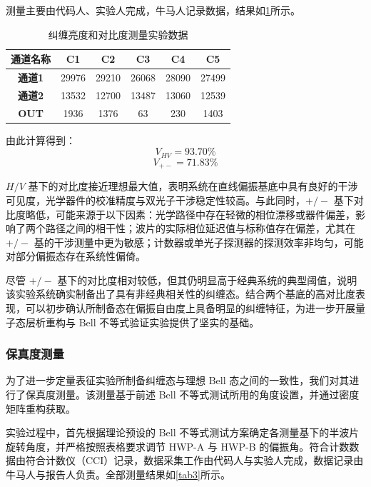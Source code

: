 测量主要由代码人、实验人完成，牛马人记录数据，结果如\cref{tab2}所示。

\begin{table}[h!]
	\centering
	\begin{tabular}{|c|c|c|c|c|c|}
		\hline
		\textbf{通道名称} & \textbf{C1} & \textbf{C2} & \textbf{C3} & \textbf{C4} & \textbf{C5} \\ \hline
		\textbf{通道1} & 29976 & 29210 & 26068 & 28090 & 27499 \\ \hline
		\textbf{通道2} & 13532 & 12700 & 13487 & 13060 & 12539 \\ \hline
		\textbf{OUT} & 1936 & 1376 & 63 & 230 & 1403 \\ \hline
	\end{tabular}
	\caption{纠缠亮度和对比度测量实验数据}
	\label{tab2}
\end{table}

由此计算得到：
$$ V_{HV} = 93.70\% $$
$$ V_{+-} = 71.83 \% $$

$H/V$ 基下的对比度接近理想最大值，表明系统在直线偏振基底中具有良好的干涉可见度，光学器件的校准精度与双光子干涉稳定性较高。与此同时，$+/-$ 基下对比度略低，可能来源于以下因素：光学路径中存在轻微的相位漂移或器件偏差，影响了两个路径之间的相干性；波片的实际相位延迟值与标称值存在偏差，尤其在 $+/-$ 基的干涉测量中更为敏感；计数器或单光子探测器的探测效率非均匀，可能对部分偏振态存在系统性偏倚。

尽管 $+/-$ 基下的对比度相对较低，但其仍明显高于经典系统的典型阈值，说明该实验系统确实制备出了具有非经典相关性的纠缠态。结合两个基底的高对比度表现，可以初步确认所制备态在偏振自由度上具备明显的纠缠特征，为进一步开展量子态层析重构与 Bell 不等式验证实验提供了坚实的基础。

\subsubsection{保真度测量}
为了进一步定量表征实验所制备纠缠态与理想 Bell 态之间的一致性，我们对其进行了保真度测量。该测量基于前述 Bell 不等式测试所用的角度设置，并通过密度矩阵重构获取。

实验过程中，首先根据理论预设的 Bell 不等式测试方案确定各测量基下的半波片旋转角度，并严格按照表格要求调节 HWP-A 与 HWP-B 的偏振角。符合计数数据由符合计数仪（CCI）记录，数据采集工作由代码人与实验人完成，数据记录由牛马人与报告人负责。全部测量结果如\cref{tab3}所示。

